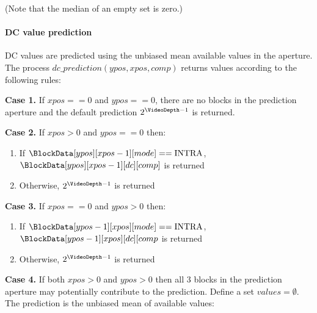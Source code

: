 (Note that the median of an empty set is zero.)

\paragraph{DC value prediction \\}
\label{dcprediction}

DC values are predicted using the unbiased mean available values in the aperture. The
process $dc\_prediction(ypos, xpos, comp)$ returns values according to
the following rules:

{\bf Case 1.}  If $xpos==0$ and $ypos==0$, there are no blocks in the prediction aperture and
the default prediction $2^{\VideoDepth-1}$ is returned.

{\bf Case 2.} If $xpos>0$ and $ypos==0$ then:
\begin{enumerate}
   \item If $\BlockData[ypos][xpos-1][mode]==\Intra$, $\BlockData[ypos][xpos-1][dc][comp]$ is returned
   \item Otherwise, $2^{\VideoDepth-1}$ is returned
\end{enumerate}

{\bf Case 3.} If $xpos==0$ and $ypos>0$ then:
\begin{enumerate}
   \item If $\BlockData[ypos-1][xpos][mode]==\Intra$, $\BlockData[ypos-1][xpos][dc][comp$ is returned
   \item Otherwise, $2^{\VideoDepth-1}$ is returned
\end{enumerate}

{\bf Case 4.} If both $xpos>0$ and $ypos>0$ then all 3 blocks in the prediction aperture may potentially
contribute to the prediction. Define a set $values=\emptyset$. The prediction is the 
unbiased mean of available values:

\begin{pseudo*}
    \bsIF{\BlockData[ypos][xpos-1][mode]==\Intra}
    \bsEND
    \bsIF{\BlockData[ypos-1][xpos][mode]==\Intra}
    \bsEND
    \bsIF{\BlockData[ypos-1][xpos-1][mode]==\Intra}
    \bsEND

    \bsELSE
    \bsEND
\bsEND
\end{pseudo*}


